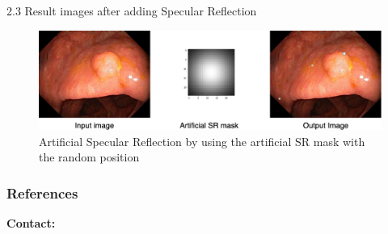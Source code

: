 \documentclass{libs/ufc_format}
\begin{document}
\begin{frame}{2.3 Result images after adding Specular Reflection}






    \begin{figure}
        \centering
        \includegraphics[width=1\textwidth]{libs/srres4.png}
        \caption{Artificial Specular Reflection by using the artificial SR mask with the random position}
        \label{sr_inpainted}
    \end{figure}
\end{frame}

\begin{frame}[shrink=50]
    \frametitle{References}
    \printbibliography
\end{frame}

\begin{frame}{}
    \centering
    \huge{\textbf{}}

    \vspace{1cm}

    \Large{\textbf{Contact:}}
    \newline
    \vspace*{0.5cm}
    \large{}
\end{frame}
\end{document}
